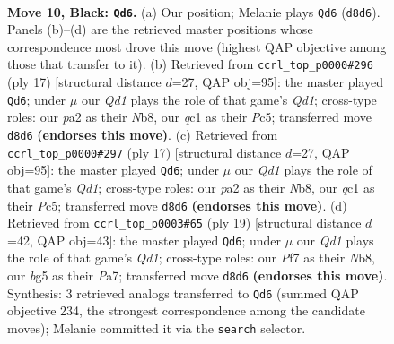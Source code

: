 \documentclass[11pt]{article}
\begin{document}
\clearpage

\begin{figure}[p]\centering
\begin{subfigure}{0.46\textwidth}\centering
\resizebox{\linewidth}{!}{%
\newchessgame
\chessboard[
  setfen={rnbqr1k1/pp2ppbp/6p1/2pP2B1/4P3/2P5/P2K1PPP/R1Q2BNR b - - 2 10},
  showmover=false,
  pgfstyle=straightmove, color=movearrow, markmove={d8-d6}
]}
\caption{}
\end{subfigure}\hfill
\begin{subfigure}{0.46\textwidth}\centering
\resizebox{\linewidth}{!}{%
\newchessgame
\chessboard[
  setfen={rnbq1rk1/pp2ppbp/6p1/2pP2B1/4P3/2P5/P4PPP/2RQKBNR b K - 0 9},
  showmover=false,
  pgfstyle=straightmove, color=movearrow, markmove={d8-d6}
]}
\caption{}
\end{subfigure}
\\[4pt]
\begin{subfigure}{0.46\textwidth}\centering
\resizebox{\linewidth}{!}{%
\newchessgame
\chessboard[
  setfen={rnbq1rk1/pp2ppbp/6p1/2pP2B1/4P3/2P5/P4PPP/2RQKBNR b K - 0 9},
  showmover=false,
  pgfstyle=straightmove, color=movearrow, markmove={d8-d6}
]}
\caption{}
\end{subfigure}\hfill
\begin{subfigure}{0.46\textwidth}\centering
\resizebox{\linewidth}{!}{%
\newchessgame
\chessboard[
  setfen={rnbq1rk1/pp2pp1p/6p1/2pP4/2B1P3/2P5/P4PPP/R2QK1NR b KQ - 0 10},
  showmover=false,
  pgfstyle=straightmove, color=movearrow, markmove={d8-d6}
]}
\caption{}
\end{subfigure}
\caption{\textbf{Move 10, Black: \texttt{Qd6}.} (a) Our position; Melanie plays \texttt{Qd6} (\texttt{d8d6}). Panels (b)--(d) are the retrieved master positions whose correspondence most drove this move (highest QAP objective among those that transfer to it). (b) Retrieved from \texttt{ccrl\_top\_p0000\#296} (ply 17) [structural distance $d$=27, QAP obj=95]: the master played \texttt{Qd6}; under $\mu$ our \emph{Qd1} plays the role of that game's \emph{Qd1}; cross-type roles: our \emph{p}a2 as their \emph{N}b8, our \emph{q}c1 as their \emph{P}c5; transferred move \texttt{d8d6} \textbf{(endorses this move)}. (c) Retrieved from \texttt{ccrl\_top\_p0000\#297} (ply 17) [structural distance $d$=27, QAP obj=95]: the master played \texttt{Qd6}; under $\mu$ our \emph{Qd1} plays the role of that game's \emph{Qd1}; cross-type roles: our \emph{p}a2 as their \emph{N}b8, our \emph{q}c1 as their \emph{P}c5; transferred move \texttt{d8d6} \textbf{(endorses this move)}. (d) Retrieved from \texttt{ccrl\_top\_p0003\#65} (ply 19) [structural distance $d$=42, QAP obj=43]: the master played \texttt{Qd6}; under $\mu$ our \emph{Qd1} plays the role of that game's \emph{Qd1}; cross-type roles: our \emph{P}f7 as their \emph{N}b8, our \emph{b}g5 as their \emph{P}a7; transferred move \texttt{d8d6} \textbf{(endorses this move)}. Synthesis: 3 retrieved analogs transferred to \texttt{Qd6} (summed QAP objective 234, the strongest correspondence among the candidate moves); Melanie committed it via the \texttt{search} selector.}
\label{fig:thought-m19}
\end{figure}
\end{document}

